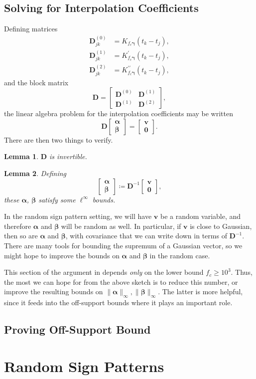 \documentclass[11pt]{article}
\newcommand{\bD}{\bm D}
\newcommand{\bv}{\bm v}
\newtheorem{lemma}{Lemma}
\begin{document}
\subsection{Solving for Interpolation Coefficients}
Defining matrices
\begin{align*}
  \bD^{(0)}_{jk} &= K_{f_c \bm \gamma}(t_k - t_j), \\
  \bD^{(1)}_{jk} &= K_{f_c \bm \gamma}^\prime(t_k - t_j), \\
  \bD^{(2)}_{jk} &= K_{f_c \bm \gamma}^{\prime\prime}(t_k - t_j),
\end{align*}
and the block matrix
\[ \bD = \left[\begin{array}{cc} \bD^{(0)} & \bD^{(1)} \\ \bD^{(1)} & \bD^{(2)} \end{array}\right], \]
the linear algebra problem for the interpolation coefficients may be written
\[ \bD\left[\begin{array}{c} \bm \alpha \\ \bm \beta \end{array}\right] = \left[\begin{array}{c} \bm v \\ \bm 0 \end{array}\right]. \]
There are then two things to verify.
\begin{lemma}
    $\bD$ is invertible.
\end{lemma}
\begin{lemma}
    Defining
    \[ \left[\begin{array}{c} \bm \alpha \\ \bm \beta \end{array}\right] \coloneqq \bD^{-1}\left[\begin{array}{c} \bm v \\ \bm 0 \end{array}\right], \]
    these $\bm\alpha$, $\bm\beta$ satisfy some $\ell^\infty$ bounds.
\end{lemma}
In the random sign pattern setting, we will have $\bv$ be a random variable, and therefore $\bm \alpha$ and $\bm\beta$ will be random as well.
In particular, if $\bv$ is close to Gaussian, then so are $\bm\alpha$ and $\bm\beta$, with covariance that we can write down in terms of $\bD^{-1}$.
There are many tools for bounding the supremum of a Gaussian vector, so we might hope to improve the bounds on $\bm\alpha$ and $\bm\beta$ in the random case.

This section of the argument in \cite{fernandez2016super} depends \emph{only} on the lower bound $f_c \geq 10^3$.
Thus, the most we can hope for from the above sketch is to reduce this number, or improve the resulting bounds on $\|\bm\alpha\|_\infty, \|\bm\beta\|_\infty$.
The latter is more helpful, since it feeds into the off-support bounds where it plays an important role.

\subsection{Proving Off-Support Bound}

\section{Random Sign Patterns}




\end{document}
